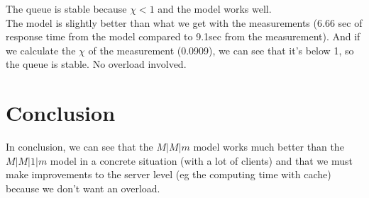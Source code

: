 \documentclass[11pt,a4paper]{article}
\begin{document}
The queue is stable because $ \chi < 1 $ and the model works well.\\
The model is slightly better than what we get with the measurements (6.66 sec of response time from the model compared to 9.1sec from the measurement). And if we calculate the $ \chi $ of the measurement (0.0909), we can see that it's below 1, so the queue is stable. No overload involved.

\section{Conclusion}
 
In conclusion, we can see that the $ M|M|m $ model works much better than the $ M|M|1|m $ model in a concrete situation (with a lot of clients) and that we must make improvements to the server level (eg the computing time with cache) because we don't want an overload. 
 
\end{document}
